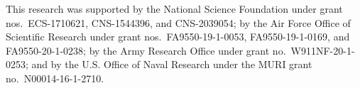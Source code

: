 
This research was supported by the National Science Foundation under grant nos.\ ECS-1710621, CNS-1544396, and CNS-2039054; by the Air Force Office of Scientific Research under grant nos.\ FA9550-19-1-0053, FA9550-19-1-0169, and FA9550-20-1-0238; by the Army Research Office under grant no.\ W911NF-20-1-0253; and by the U.S. Office of Naval Research under the MURI grant no.\ N00014-16-1-2710.